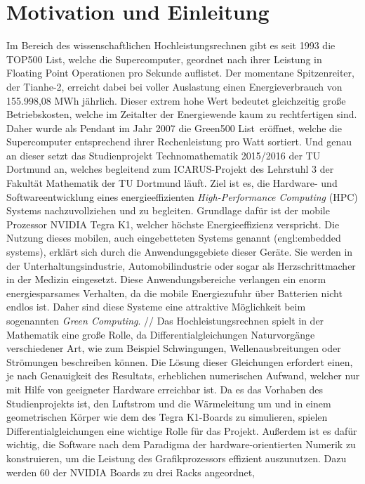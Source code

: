 \section{Motivation und Einleitung}
Im Bereich des wissenschaftlichen Hochleistungsrechnen gibt es seit 1993 die
\glqq TOP500 List\grqq \cite{Top500}, welche die Supercomputer, geordnet nach ihrer Leistung 
in Floating Point Operationen pro Sekunde auflistet. Der momentane Spitzenreiter, 
der Tianhe-2, erreicht dabei bei voller Auslastung einen Energieverbrauch von 155.998,08 MWh 
jährlich. Dieser extrem hohe Wert bedeutet gleichzeitig große Betriebskosten,
 welche im Zeitalter der Energiewende kaum zu rechtfertigen sind. Daher wurde 
als Pendant im Jahr 2007 die \glqq Green500 List\grqq\, eröffnet, welche 
die Supercomputer entsprechend ihrer Rechenleistung pro Watt sortiert. Und genau 
an dieser setzt das Studienprojekt Technomathematik 2015/2016 der TU Dortmund an, 
welches begleitend zum ICARUS-Projekt des Lehrstuhl 3 der Fakultät Mathematik der TU Dortmund läuft. 
Ziel ist es, die Hardware- und Softwareentwicklung eines energieeffizienten 
\textit{High-Performance Computing} (HPC) Systems nachzuvollziehen und zu begleiten. 
Grundlage dafür ist der mobile Prozessor NVIDIA Tegra K1, 
welcher höchste Energieeffizienz verspricht. Die Nutzung dieses mobilen, 
auch eingebetteten Systems genannt (engl:\glqq embedded systems\grqq), 
erklärt sich durch die Anwendungsgebiete dieser Geräte. 
Sie werden in der Unterhaltungsindustrie, Automobilindustrie oder sogar als Herzschrittmacher in der Medizin eingesetzt. 
Diese Anwendungsbereiche verlangen ein enorm energiesparsames Verhalten, da die mobile Energiezufuhr über Batterien nicht endlos ist.
Daher sind diese Systeme eine attraktive Möglichkeit beim sogenannten \textit{Green Computing}. 
//
Das Hochleistungsrechnen spielt in der Mathematik eine große Rolle,
 da Differentialgleichungen Naturvorgänge verschiedener Art, wie zum Beispiel Schwingungen,
 Wellenausbreitungen oder Strömungen beschreiben können. Die Lösung dieser Gleichungen erfordert einen,
 je nach Genauigkeit des Resultats, erheblichen numerischen Aufwand,
 welcher nur mit Hilfe von geeigneter Hardware erreichbar ist. Da es das Vorhaben des Studienprojekts ist,
 den Luftstrom und die Wärmeleitung um und in einem geometrischen Körper wie dem des Tegra K1-Boards zu simulieren,
 spielen Differentialgleichungen eine wichtige Rolle für das Projekt. Außerdem ist es dafür wichtig,
 die Software nach dem Paradigma der hardware-orientierten Numerik zu konstruieren,
 um die Leistung des Grafikprozessors effizient auszunutzen. Dazu werden 60 der NVIDIA Boards zu drei Racks angeordnet,
